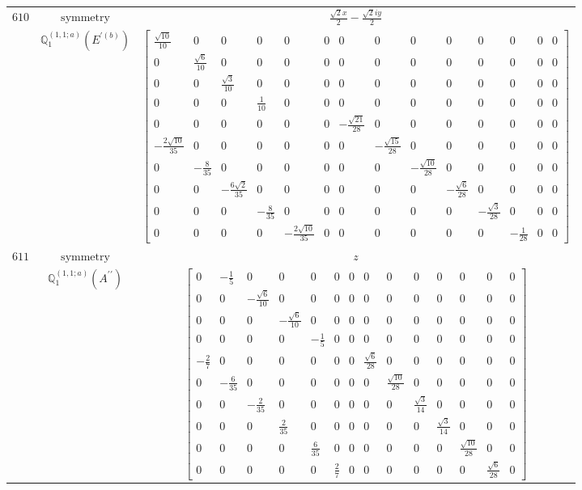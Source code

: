 \documentclass[fleqn,8pt,landscape]{jsarticle}
\begin{document}
\begin{longtable}{ccc}
$ 610 $ & $ \text{symmetry} $ & $ \frac{\sqrt{2} x}{2} - \frac{\sqrt{2} i y}{2} $ \\
$  $ & $ \mathbb{Q}_{1}^{(1,1;a)}(E^{\prime(b)}) $ & $ \begin{bmatrix} \frac{\sqrt{10}}{10} & 0 & 0 & 0 & 0 & 0 & 0 & 0 & 0 & 0 & 0 & 0 & 0 & 0 \\ 0 & \frac{\sqrt{6}}{10} & 0 & 0 & 0 & 0 & 0 & 0 & 0 & 0 & 0 & 0 & 0 & 0 \\ 0 & 0 & \frac{\sqrt{3}}{10} & 0 & 0 & 0 & 0 & 0 & 0 & 0 & 0 & 0 & 0 & 0 \\ 0 & 0 & 0 & \frac{1}{10} & 0 & 0 & 0 & 0 & 0 & 0 & 0 & 0 & 0 & 0 \\ 0 & 0 & 0 & 0 & 0 & 0 & - \frac{\sqrt{21}}{28} & 0 & 0 & 0 & 0 & 0 & 0 & 0 \\ - \frac{2 \sqrt{10}}{35} & 0 & 0 & 0 & 0 & 0 & 0 & - \frac{\sqrt{15}}{28} & 0 & 0 & 0 & 0 & 0 & 0 \\ 0 & - \frac{8}{35} & 0 & 0 & 0 & 0 & 0 & 0 & - \frac{\sqrt{10}}{28} & 0 & 0 & 0 & 0 & 0 \\ 0 & 0 & - \frac{6 \sqrt{2}}{35} & 0 & 0 & 0 & 0 & 0 & 0 & - \frac{\sqrt{6}}{28} & 0 & 0 & 0 & 0 \\ 0 & 0 & 0 & - \frac{8}{35} & 0 & 0 & 0 & 0 & 0 & 0 & - \frac{\sqrt{3}}{28} & 0 & 0 & 0 \\ 0 & 0 & 0 & 0 & - \frac{2 \sqrt{10}}{35} & 0 & 0 & 0 & 0 & 0 & 0 & - \frac{1}{28} & 0 & 0 \end{bmatrix} $ \\ \hline
$ 611 $ & $ \text{symmetry} $ & $ z $ \\
$  $ & $ \mathbb{Q}_{1}^{(1,1;a)}(A^{\prime\prime}) $ & $ \begin{bmatrix} 0 & - \frac{1}{5} & 0 & 0 & 0 & 0 & 0 & 0 & 0 & 0 & 0 & 0 & 0 & 0 \\ 0 & 0 & - \frac{\sqrt{6}}{10} & 0 & 0 & 0 & 0 & 0 & 0 & 0 & 0 & 0 & 0 & 0 \\ 0 & 0 & 0 & - \frac{\sqrt{6}}{10} & 0 & 0 & 0 & 0 & 0 & 0 & 0 & 0 & 0 & 0 \\ 0 & 0 & 0 & 0 & - \frac{1}{5} & 0 & 0 & 0 & 0 & 0 & 0 & 0 & 0 & 0 \\ - \frac{2}{7} & 0 & 0 & 0 & 0 & 0 & 0 & \frac{\sqrt{6}}{28} & 0 & 0 & 0 & 0 & 0 & 0 \\ 0 & - \frac{6}{35} & 0 & 0 & 0 & 0 & 0 & 0 & \frac{\sqrt{10}}{28} & 0 & 0 & 0 & 0 & 0 \\ 0 & 0 & - \frac{2}{35} & 0 & 0 & 0 & 0 & 0 & 0 & \frac{\sqrt{3}}{14} & 0 & 0 & 0 & 0 \\ 0 & 0 & 0 & \frac{2}{35} & 0 & 0 & 0 & 0 & 0 & 0 & \frac{\sqrt{3}}{14} & 0 & 0 & 0 \\ 0 & 0 & 0 & 0 & \frac{6}{35} & 0 & 0 & 0 & 0 & 0 & 0 & \frac{\sqrt{10}}{28} & 0 & 0 \\ 0 & 0 & 0 & 0 & 0 & \frac{2}{7} & 0 & 0 & 0 & 0 & 0 & 0 & \frac{\sqrt{6}}{28} & 0 \end{bmatrix} $ \\ \hline

\end{longtable}
\end{document}
